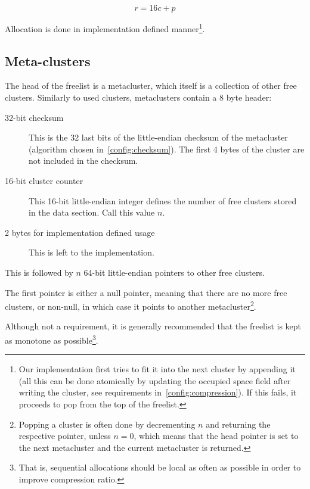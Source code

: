 \documentclass[11pt,a4paper]{report}
\newcommand{\maxpagesincluster}{16 }
\begin{document}
        $$r = \maxpagesincluster c + p$$

        Allocation is done in implementation defined manner\footnote{Our
        implementation first tries to fit it into the next cluster by
        appending it (all this can be done atomically by updating the
        occupied space field after writing the cluster, see requirements
        in~\ref{config:compression}). If this fails, it proceeds to pop
        from the top of the freelist.}.

        \subsection{Meta-clusters}
        \label{cluster:metacluster}
        The head of the freelist is a metacluster, which itself is a collection
        of other free clusters. Similarly to used clusters, metaclusters
        contain a 8 byte header:

        \begin{description}
            \item [32-bit checksum] This is the 32 last bits of the
                little-endian checksum of the metacluster (algorithm chosen
                in~\ref{config:checksum}). The first 4 bytes of the cluster are
                not included in the checksum.
            \item [16-bit cluster counter] This 16-bit little-endian integer
                defines the number of free clusters stored in the data section.
                Call this value $n$.
            \item [2 bytes for implementation defined usage] This is
                left to the implementation.
        \end{description}

        This is followed by $n$ 64-bit little-endian pointers to other free
        clusters.

        The first pointer is either a null pointer, meaning that there are no
        more free clusters, or non-null, in which case it points to another
        metacluster\footnote{Popping a cluster is often done by decrementing
        $n$ and returning the respective pointer, unless $n = 0$, which means
        that the head pointer is set to the next metacluster and the current
        metacluster is returned.}.

        Although not a requirement, it is generally recommended that
        the freelist is kept as monotone as possible\footnote{That is,
        sequential allocations should be local as often as possible in
        order to improve compression ratio.}.
\end{document}
